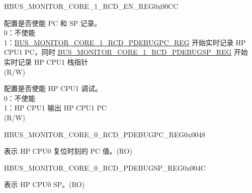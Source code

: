 \begin{register}{H}{BUS\_MONITOR\_CORE\_1\_RCD\_EN\_REG}{0x00CC}\label{regdesc:BUSMONITORCORE1RCDENREG}
%
%
%
\regnewline%
\begin{regdesc}\begin{reglist}
\label{fielddesc:BUSMONITORCORE1RCDRECORDEN}\item [BUS\_MONITOR\_CORE\_1\_RCD\_RECORDEN] 配置是否使能 PC 和 SP 记录。\\
0：不使能\\
1：\hyperref[regdesc:BUSMONITORCORE1RCDPDEBUGPCREG]{BUS\_MONITOR\_CORE\_1\_RCD\_PDEBUGPC\_REG} 开始实时记录 HP CPU1 PC，同时 \hyperref[regdesc:BUSMONITORCORE1RCDPDEBUGSPREG]{BUS\_MONITOR\_CORE\_1\_RCD\_PDEBUGSP\_REG} 开始实时记录 HP CPU1 栈指针\\ (R/W)
\label{fielddesc:BUSMONITORCORE1RCDPDEBUGEN}\item [BUS\_MONITOR\_CORE\_1\_RCD\_PDEBUGEN] 配置是否使能 HP CPU1 调试。\\
0：不使能\\
1：HP CPU1 输出 HP CPU1 PC\\ (R/W)
\end{reglist}\end{regdesc}
\end{register}


\begin{register}{H}{BUS\_MONITOR\_CORE\_0\_RCD\_PDEBUGPC\_REG}{0x0048}\label{regdesc:BUSMONITORCORE0RCDPDEBUGPCREG}
%
\regnewline%
\begin{regdesc}\begin{reglist}
\label{fielddesc:BUSMONITORCORE0RCDPDEBUGPC}\item [BUS\_MONITOR\_CORE\_0\_RCD\_PDEBUGPC] 表示 HP CPU0 复位时刻的 PC 值。(RO)
\end{reglist}\end{regdesc}
\end{register}


\begin{register}{H}{BUS\_MONITOR\_CORE\_0\_RCD\_PDEBUGSP\_REG}{0x004C}\label{regdesc:BUSMONITORCORE0RCDPDEBUGSPREG}
%
\regnewline%
\begin{regdesc}\begin{reglist}
\label{fielddesc:BUSMONITORCORE0RCDPDEBUGSP}\item [BUS\_MONITOR\_CORE\_0\_RCD\_PDEBUGSP] 表示 HP CPU0 SP。(RO)
\end{reglist}\end{regdesc}
\end{register}


